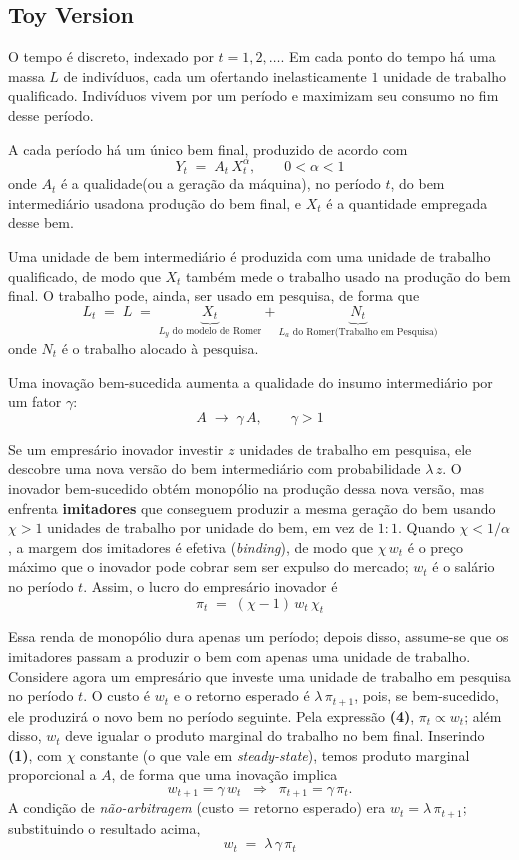 \documentclass[a4paper,12pt]{article}[abntex2]
\begin{document}
\subsection{\textbf{Toy Version}}
O tempo é discreto, indexado por $t = 1,2,\dots$. Em cada ponto do tempo há uma massa $L$ de indivíduos, cada um ofertando inelasticamente $1$ unidade de trabalho qualificado. Indivíduos vivem por um período e maximizam seu consumo no fim desse período.

A cada período há um único bem final, produzido de acordo com
\[
 Y_t \;=\; A_t\,X_t^{\alpha},
 \qquad 0<\alpha<1
 \tag{1}
\]
onde $A_t$ é a qualidade(ou a geração da máquina), no período $t$, do bem intermediário usadona produção do bem final, e $X_t$ é a quantidade empregada desse bem.

Uma unidade de bem intermediário é produzida com uma unidade de trabalho qualificado, de modo que $X_t$ também mede o trabalho usado na produção do bem final.  O trabalho pode, ainda, ser usado em pesquisa, de forma que
\[
 L_t \;=\; L \;=\; \underbrace{X_t}_\text{\(L_y\) do modelo de Romer} + \underbrace{N_t}_\text{\(L_a\) do Romer(Trabalho em Pesquisa)}
 \tag{2}
\]
onde $N_t$ é o trabalho alocado à pesquisa.

Uma inovação bem-sucedida aumenta a qualidade do insumo intermediário por um fator $\gamma$:
\[
 A \;\longrightarrow\; \gamma\,A, 
 \qquad \gamma>1
 \tag{3}
\]

Se um empresário inovador investir $z$ unidades de trabalho em pesquisa, ele descobre uma nova versão do bem intermediário com probabilidade $\lambda\,z$. O inovador bem-sucedido obtém monopólio na produção dessa nova versão, mas enfrenta \textbf{imitadores} que conseguem produzir a mesma geração do bem usando $\chi>1$ unidades de trabalho por unidade do bem, em vez de $1{:}1$.   Quando $\chi<1/\alpha$, a margem dos imitadores é efetiva (\emph{binding}), de modo que $\chi\,w_t$ é o preço máximo que o inovador pode cobrar sem ser expulso do mercado; $w_t$ é o salário no período $t$.  Assim, o lucro do empresário inovador é
\[
 \pi_t \;=\; (\chi-1)\,w_t\,\chi_t
 \tag{4}
\]

Essa renda de monopólio dura apenas um período; depois disso, assume-se que os imitadores passam a produzir o bem com apenas uma unidade de trabalho.  Considere agora um empresário que investe uma unidade de trabalho em pesquisa no período $t$.  O custo é $w_t$ e o retorno esperado é $\lambda\,\pi_{t+1}$, pois, se bem-sucedido, ele produzirá o novo bem no período seguinte.   Pela expressão \textbf{(4)}, $\pi_t\propto w_t$; além disso, $w_t$ deve igualar o produto marginal do trabalho no bem final.  Inserindo \textbf{(1)}, com $\chi$ constante (o que vale em \emph{steady-state}), temos produto marginal proporcional a $A$, de forma que uma inovação implica
\[
 w_{t+1} = \gamma\,w_t
 \;\;\Longrightarrow\;\;
 \pi_{t+1} = \gamma\,\pi_t .
\]
A condição de \emph{não-arbitragem} (custo = retorno esperado) era
$w_t=\lambda\,\pi_{t+1}$; substituindo o resultado acima,
\[
 w_t \;=\; \lambda\,\gamma\,\pi_t
 \tag{5}
\]
\end{document}
